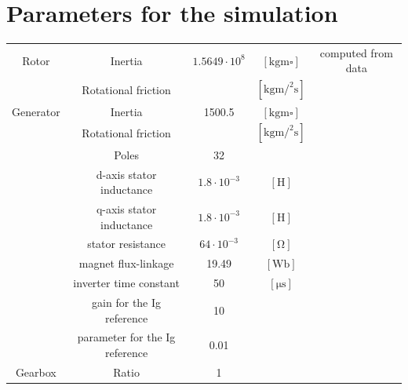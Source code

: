 \documentclass[]{article}
\begin{document}
\section{Parameters for the simulation}
\begin{center}
	\begin{tabular}{c|cccc}
		Rotor & Inertia & $1.5649 \cdot 10^8$ & $\left[\si{\kilo \gram \meter \square}\right]$ & computed from data\\ 
		& Rotational friction &  & $\left[\si{\kilo \gram \meter \square \per \second}\right]$ & \\ \hline 
		Generator & Inertia & 1500.5 & $\left[\si{\kilo \gram \meter \square}\right]$ & \cite{DTU_Wind_Energy_Report-I-0092} \\
		& Rotational friction &  & $\left[\si{\kilo \gram \meter \square \per \second}\right]$ & \\
		& Poles & 32 & & \cite{the_switch_datasheet} \\
		& d-axis stator inductance & $1.8 \cdot 10^{-3}$ & $\left[\si{\henry}\right]$ & \cite{10-MW_Direct-Drive_PMSG-Based_Wind_Energy_Conversion_System_Model} \\
		& q-axis stator inductance & $1.8 \cdot 10^{-3}$ & $\left[\si{\henry}\right]$ & \cite{10-MW_Direct-Drive_PMSG-Based_Wind_Energy_Conversion_System_Model} \\
		& stator resistance & $64 \cdot 10^{-3}$ & $\left[ \si{\ohm}\right]$ & \cite{10-MW_Direct-Drive_PMSG-Based_Wind_Energy_Conversion_System_Model}\\
		& magnet flux-linkage & 19.49 & $\left[ \si{\weber}\right]$ & \cite{10-MW_Direct-Drive_PMSG-Based_Wind_Energy_Conversion_System_Model} \\
		& inverter time constant & 50 & $\left[ \si{\micro \second}\right]$& \\
		& gain for the Ig reference & 10 & & \cite{5874598} \\
		& parameter for the Ig reference & 0.01 & & \cite{5874598} \\ \hline
		Gearbox & Ratio & 1 & & \\
		
	\end{tabular}
\end{center}


\newpage
{\footnotesize
}
\end{document}
